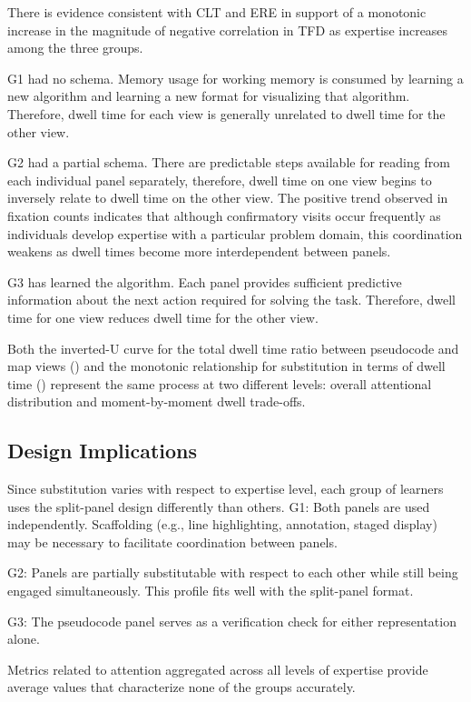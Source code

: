 \documentclass[journal]{vgtc}
\begin{document}
There is evidence consistent with CLT and ERE in support of a
monotonic increase in the magnitude of negative correlation in TFD
as expertise increases among the three groups.

G1 had no schema. Memory usage for working memory is consumed by
learning a new algorithm and learning a new format for visualizing
that algorithm. Therefore, dwell time for each view is generally
unrelated to dwell time for the other view.

G2 had a partial schema. There are predictable steps available for
reading from each individual panel separately, therefore, dwell time
on one view begins to inversely relate to dwell time on the other
view. The positive trend observed in fixation counts indicates that
although confirmatory visits occur frequently as individuals develop
expertise with a particular problem domain, this coordination
weakens as dwell times become more interdependent between panels.

G3 has learned the algorithm. Each panel provides sufficient
predictive information about the next action required for solving
the task. Therefore, dwell time for one view reduces dwell time for
the other view.

Both the inverted-U curve for the total dwell time ratio between
pseudocode and map views () and the monotonic
relationship for substitution in terms of dwell time
() represent the same process at two different
levels: overall attentional distribution and moment-by-moment dwell
trade-offs.

\subsection{Design Implications}

Since substitution varies with respect to expertise level, each
group of learners uses the split-panel design differently than
others. G1: Both panels are used independently. Scaffolding (e.g.,
line highlighting, annotation, staged display) may be necessary to
facilitate coordination between panels.

G2: Panels are partially substitutable with respect to each other
while still being engaged simultaneously. This profile fits well
with the split-panel format.

G3: The pseudocode panel serves as a verification check for either
representation alone.

Metrics related to attention aggregated across all levels of
expertise provide average values that characterize none of the
groups accurately.
\end{document}
